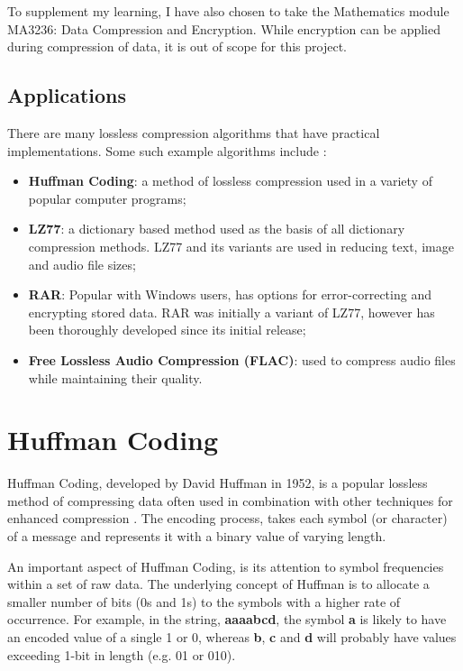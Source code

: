 \documentclass[12pt]{article}
\begin{document}
	To supplement my learning, I have also chosen to take the Mathematics module MA3236: Data Compression and Encryption. While encryption can be applied during compression of data, it is out of scope for this project.
	
	\subsection{Applications}
	There are many lossless compression algorithms that have practical implementations. Some such example algorithms include \citep[p.~1050-1065]{dc_complete_ref}:
	
	\begin{itemize}
		\item \textbf{Huffman Coding}: a method of lossless compression used in a variety of popular computer programs;
		
		\item \textbf{LZ77}: a dictionary based method used as the basis of all dictionary compression methods. LZ77 and its variants are used in reducing text, image and audio file sizes;
		
		\item \textbf{RAR}: Popular with Windows users, has options for error-correcting and encrypting stored data. RAR was initially a variant of LZ77, however has been thoroughly developed since its initial release;
		
		\item \textbf{Free Lossless Audio Compression (FLAC)}: used to compress audio files while maintaining their quality.

	\end{itemize}
	
	\section{Huffman Coding}
	Huffman Coding, developed by David Huffman in 1952, is a popular lossless method of compressing data often used in combination with other techniques for enhanced compression \citep{dc_complete_ref}. The encoding process, takes each symbol (or character) of a message and represents it with a binary value of varying length.
	
	An important aspect of Huffman Coding, is its attention to symbol frequencies within a set of raw data. The underlying concept of Huffman is to allocate a smaller number of bits (0s and 1s) to the symbols with a higher rate of occurrence. For example, in the string,	\textbf{aaaabcd}, the symbol \textbf{a} is likely to have an encoded value of a single 1 or 0, whereas \textbf{b}, \textbf{c} and \textbf{d} will probably have values exceeding 1-bit in length (e.g. 01 or 010).
	
\end{document}
